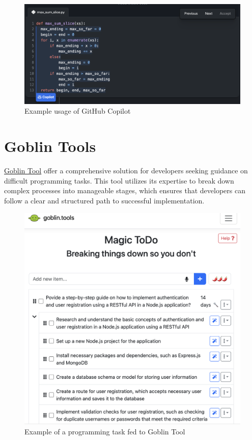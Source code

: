 \documentclass[
]{book}
\begin{document}
\begin{figure}

{\centering \includegraphics[width=0.95\linewidth]{GitHub_Copilot_Example} 

}

\caption{Example usage of GitHub Copilot}\label{fig:unnamed-chunk-10}
\end{figure}

\hypertarget{goblin-tools}{%
\section{Goblin Tools}\label{goblin-tools}}

\href{https://goblin.tools/}{Goblin Tool} offer a comprehensive solution for developers seeking guidance on difficult programming tasks. This tool utilizes its expertise to break down complex processes into manageable stages, which ensures that developers can follow a clear and structured path to successful implementation.

\begin{figure}

{\centering \includegraphics[width=0.7\linewidth]{Goblin_Tool_Example} 

}

\caption{Example of a programming task fed to Goblin Tool}\label{fig:unnamed-chunk-11}
\end{figure}
\end{document}
